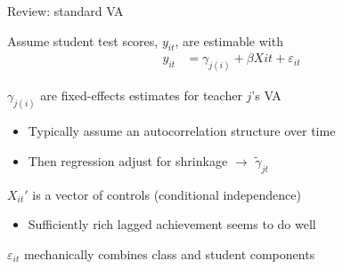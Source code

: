 \documentclass[t,aspectratio=169,11pt]{beamer}
\begin{document}
\begin{frame}{Review: standard VA}
    \begin{wideitemize}
    \item Assume student test scores, $y_{it}$, are estimable with
    \begin{align*}
        y_{it} &= \gamma_{j(i)} + \beta X{it} +  \varepsilon_{it}
    \end{align*}
    \item $\gamma_{j(i)}$ are fixed-effects estimates for teacher $j$'s VA 
    \begin{itemize}
        \item Typically assume an autocorrelation structure over time
        \item Then regression adjust for shrinkage $\to$ $\tilde{\gamma}_{jt}$
    \end{itemize}
    \item $X_{it}'$ is a vector of controls (conditional independence)
        \begin{itemize}
            \item Sufficiently rich lagged achievement seems to do well \citep{chetty2014measuring1}
        \end{itemize}
    \item $\varepsilon_{it}$ mechanically combines class and student components
    \end{wideitemize}
    
\end{frame}


\end{document}
